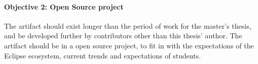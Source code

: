 \paragraph{Objective 2: Open Source project}
The artifact should exist longer than the period of work for the master's thesis, and be developed further by contributors other than this thesis' author.
The artifact should be in a \gls{open source} project, to fit in with the expectations of the Eclipse ecosystem, current trends and expectations of students.

